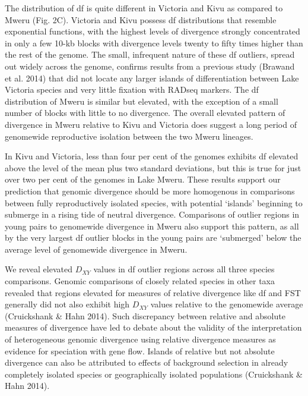 The distribution of df is quite different in Victoria and Kivu as compared to Mweru (Fig. 2C). Victoria and Kivu possess df distributions that resemble exponential functions, with the highest levels of divergence strongly concentrated in only a few 10-kb blocks with divergence levels twenty to fifty times higher than the rest of the genome. The small, infrequent nature of these df outliers, spread out widely across the genome, confirms results from a previous study (Brawand et al. 2014) that did not locate any larger islands of differentiation between Lake Victoria species and very little fixation with RADseq markers. The df distribution of Mweru is similar but elevated, with the exception of a small number of blocks with little to no divergence. The overall elevated pattern of divergence in Mweru relative to Kivu and Victoria does suggest a long period of genomewide reproductive isolation between the two Mweru lineages.

In Kivu and Victoria, less than four per cent of the genomes exhibits df elevated above the level of the mean plus two standard deviations, but this is true for just over two per cent of the genomes in Lake Mweru. These results support our prediction that genomic divergence should be more homogenous in comparisons between fully reproductively isolated species, with potential ‘islands’ beginning to submerge in a rising tide of neutral divergence. Comparisons of outlier regions in young pairs to genomewide divergence in Mweru also support this pattern, as all by the very largest df outlier blocks in the young pairs are ‘submerged’ below the average level of genomewide divergence in Mweru.

We reveal elevated $D_{XY}$ values in df outlier regions across all three species comparisons. Genomic comparisons of closely related species in other taxa revealed that regions elevated for measures of relative divergence like df and FST generally did not also exhibit high $D_{XY}$ values relative to the genomewide average (Cruickshank & Hahn 2014). Such discrepancy between relative and absolute measures of divergence have led to debate about the validity of the interpretation of heterogeneous genomic divergence using relative divergence measures as evidence for speciation with gene flow. Islands of relative but not absolute divergence can also be attributed to effects of background selection in already completely isolated species or geographically isolated populations (Cruickshank & Hahn 2014).

